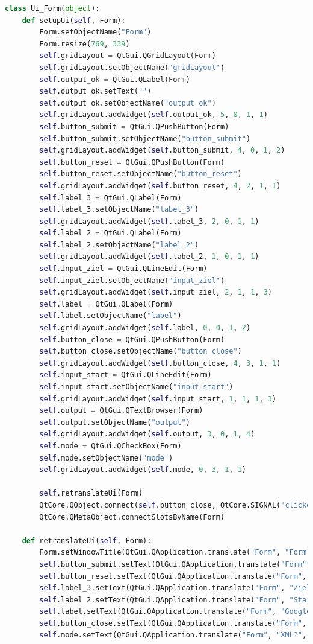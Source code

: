 \begin{lstlisting}[language=python]
class Ui_Form(object):
	def setupUi(self, Form):
		Form.setObjectName("Form")
		Form.resize(769, 339)
		self.gridLayout = QtGui.QGridLayout(Form)
		self.gridLayout.setObjectName("gridLayout")
		self.output_ok = QtGui.QLabel(Form)
		self.output_ok.setText("")
		self.output_ok.setObjectName("output_ok")
		self.gridLayout.addWidget(self.output_ok, 5, 0, 1, 1)
		self.button_submit = QtGui.QPushButton(Form)
		self.button_submit.setObjectName("button_submit")
		self.gridLayout.addWidget(self.button_submit, 4, 0, 1, 2)
		self.button_reset = QtGui.QPushButton(Form)
		self.button_reset.setObjectName("button_reset")
		self.gridLayout.addWidget(self.button_reset, 4, 2, 1, 1)
		self.label_3 = QtGui.QLabel(Form)
		self.label_3.setObjectName("label_3")
		self.gridLayout.addWidget(self.label_3, 2, 0, 1, 1)
		self.label_2 = QtGui.QLabel(Form)
		self.label_2.setObjectName("label_2")
		self.gridLayout.addWidget(self.label_2, 1, 0, 1, 1)
		self.input_ziel = QtGui.QLineEdit(Form)
		self.input_ziel.setObjectName("input_ziel")
		self.gridLayout.addWidget(self.input_ziel, 2, 1, 1, 3)
		self.label = QtGui.QLabel(Form)
		self.label.setObjectName("label")
		self.gridLayout.addWidget(self.label, 0, 0, 1, 2)
		self.button_close = QtGui.QPushButton(Form)
		self.button_close.setObjectName("button_close")
		self.gridLayout.addWidget(self.button_close, 4, 3, 1, 1)
		self.input_start = QtGui.QLineEdit(Form)
		self.input_start.setObjectName("input_start")
		self.gridLayout.addWidget(self.input_start, 1, 1, 1, 3)
		self.output = QtGui.QTextBrowser(Form)
		self.output.setObjectName("output")
		self.gridLayout.addWidget(self.output, 3, 0, 1, 4)
		self.mode = QtGui.QCheckBox(Form)
		self.mode.setObjectName("mode")
		self.gridLayout.addWidget(self.mode, 0, 3, 1, 1)
		
		self.retranslateUi(Form)
		QtCore.QObject.connect(self.button_close, QtCore.SIGNAL("clicked()"), Form.close)
		QtCore.QMetaObject.connectSlotsByName(Form)
		
	def retranslateUi(self, Form):
		Form.setWindowTitle(QtGui.QApplication.translate("Form", "Form", None, QtGui.QApplication.UnicodeUTF8))
		self.button_submit.setText(QtGui.QApplication.translate("Form", "Submit", None, QtGui.QApplication.UnicodeUTF8))
		self.button_reset.setText(QtGui.QApplication.translate("Form", "Reset", None, QtGui.QApplication.UnicodeUTF8))
		self.label_3.setText(QtGui.QApplication.translate("Form", "Ziel:", None, QtGui.QApplication.UnicodeUTF8))
		self.label_2.setText(QtGui.QApplication.translate("Form", "Start:", None, QtGui.QApplication.UnicodeUTF8))
		self.label.setText(QtGui.QApplication.translate("Form", "Google Navigation", None, QtGui.QApplication.UnicodeUTF8))
		self.button_close.setText(QtGui.QApplication.translate("Form", "Close", None, QtGui.QApplication.UnicodeUTF8))
		self.mode.setText(QtGui.QApplication.translate("Form", "XML?", None, QtGui.QApplication.UnicodeUTF8))


\end{lstlisting}

